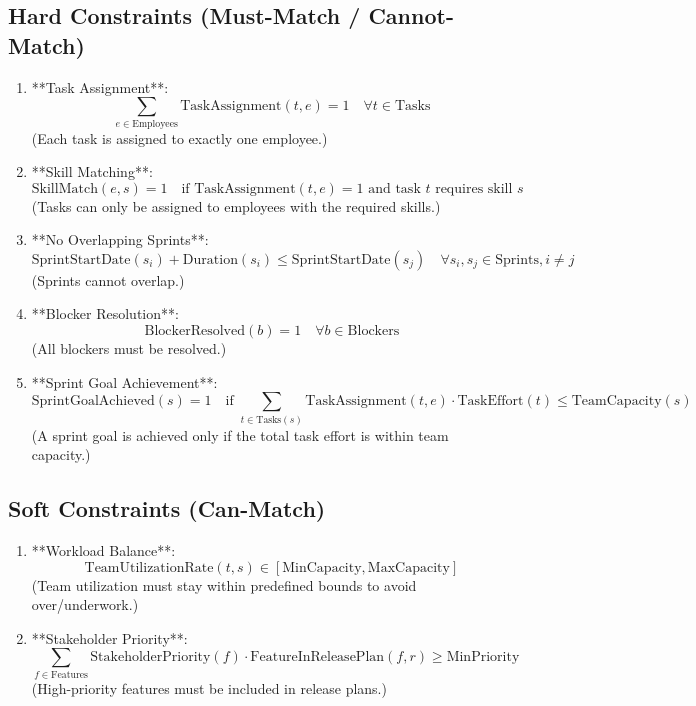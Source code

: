 \documentclass{article}
\begin{document}
\subsection{Hard Constraints (Must-Match / Cannot-Match)}
\begin{enumerate}
    \item **Task Assignment**: 
    $$
    \sum_{e \in \text{Employees}} \text{TaskAssignment}(t, e) = 1 \quad \forall t \in \text{Tasks}
    $$
    (Each task is assigned to exactly one employee.) \label{constraint:task-assignment}

    \item **Skill Matching**: 
    $$
    \text{SkillMatch}(e, s) = 1 \quad \text{if } \text{TaskAssignment}(t, e) = 1 \text{ and task } t \text{ requires skill } s
    $$
    (Tasks can only be assigned to employees with the required skills.) \label{constraint:skill-matching}

    \item **No Overlapping Sprints**: 
    $$
    \text{SprintStartDate}(s_i) + \text{Duration}(s_i) \leq \text{SprintStartDate}(s_j) \quad \forall s_i, s_j \in \text{Sprints}, i \neq j
    $$
    (Sprints cannot overlap.) \label{constraint:no-overlap}

    \item **Blocker Resolution**: 
    $$
    \text{BlockerResolved}(b) = 1 \quad \forall b \in \text{Blockers}
    $$
    (All blockers must be resolved.) \label{constraint:blocker-resolution}

    \item **Sprint Goal Achievement**: 
    $$
    \text{SprintGoalAchieved}(s) = 1 \quad \text{if } \sum_{t \in \text{Tasks}(s)} \text{TaskAssignment}(t, e) \cdot \text{TaskEffort}(t) \leq \text{TeamCapacity}(s)
    $$
    (A sprint goal is achieved only if the total task effort is within team capacity.) \label{constraint:sprint-goal}
\end{enumerate}

\subsection{Soft Constraints (Can-Match)}
\begin{enumerate}
    \item **Workload Balance**: 
    $$
    \text{TeamUtilizationRate}(t, s) \in [\text{MinCapacity}, \text{MaxCapacity}]
    $$
    (Team utilization must stay within predefined bounds to avoid over/underwork.) \label{constraint:workload}

    \item **Stakeholder Priority**: 
    $$
    \sum_{f \in \text{Features}} \text{StakeholderPriority}(f) \cdot \text{FeatureInReleasePlan}(f, r) \geq \text{MinPriority}
    $$
    (High-priority features must be included in release plans.) \label{constraint:stakeholder}
\end{enumerate}
\end{document}
